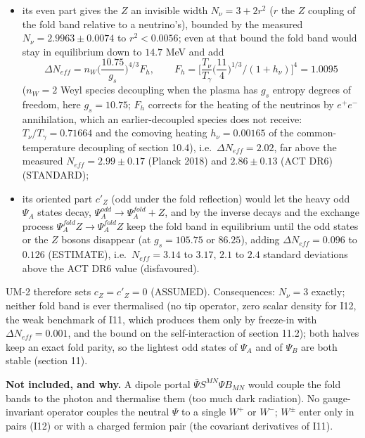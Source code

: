 \documentclass[
  10pt,
]{article}
\providecommand{\tightlist}{%
  \setlength{\itemsep}{0pt}\setlength{\parskip}{0pt}}
\begin{document}
\begin{itemize}
\tightlist
\item
  its even part gives the \(Z\) an invisible width \(N_\nu = 3 + 2r^2\)
  (\(r\) the \(Z\) coupling of the fold band relative to a neutrino's),
  bounded by the measured \(N_\nu = 2.9963 \pm 0.0074\) to
  \(r^2 < 0.0056\); even at that bound the fold band would stay in
  equilibrium down to \(14.7\) MeV and add
  \[ \Delta N_{eff} = n_W\Big(\frac{10.75}{g_s}\Big)^{4/3}F_h,\qquad F_h = \Big[\frac{T_\nu}{T_\gamma}\Big(\frac{11}{4}\Big)^{1/3}\Big/(1 + h_\nu)\Big]^4 = 1.0095 \]
  (\(n_W = 2\) Weyl species decoupling when the plasma has \(g_s\)
  entropy degrees of freedom, here \(g_s = 10.75\); \(F_h\) corrects for
  the heating of the neutrinos by \(e^+e^-\) annihilation, which an
  earlier-decoupled species does not receive:
  \(T_\nu/T_\gamma = 0.71664\) and the comoving heating
  \(h_\nu = 0.00165\) of the common-temperature decoupling of section
  10.4), i.e.~\(\Delta N_{eff} = 2.02\), far above the measured
  \(N_{eff} = 2.99 \pm 0.17\) (Planck 2018) and \(2.86 \pm 0.13\) (ACT
  DR6) (STANDARD);
\item
  its oriented part \(c'_Z\) (odd under the fold reflection) would let
  the heavy odd \(\Psi_A\) states decay,
  \(\Psi_A^{odd} \to \Psi_A^{fold} + Z\), and by the inverse decays and
  the exchange process \(\Psi_A^{fold}Z \to \Psi_A^{fold}Z\) keep the
  fold band in equilibrium until the odd states or the \(Z\) bosons
  disappear (at \(g_s = 105.75\) or \(86.25\)), adding
  \(\Delta N_{eff} = 0.096\) to \(0.126\) (ESTIMATE),
  i.e.~\(N_{eff} = 3.14\) to \(3.17\), \(2.1\) to \(2.4\) standard
  deviations above the ACT DR6 value (disfavoured).
\end{itemize}

UM-2 therefore sets \(c_Z = c'_Z = 0\) (ASSUMED). Consequences:
\(N_\nu = 3\) exactly; neither fold band is ever thermalised (no tip
operator, zero scalar density for I12, the weak benchmark of I11, which
produces them only by freeze-in with \(\Delta N_{eff} = 0.001\), and the
bound on the self-interaction of section 11.2); both halves keep an
exact fold parity, so the lightest odd states of \(\Psi_A\) and of
\(\Psi_B\) are both stable (section 11).

\textbf{Not included, and why.} A dipole portal
\(\bar\Psi S^{MN}\Psi B_{MN}\) would couple the fold bands to the photon
and thermalise them (too much dark radiation). No gauge-invariant
operator couples the neutral \(\Psi\) to a single \(W^+\) or \(W^-\);
\(W^\pm\) enter only in pairs (I12) or with a charged fermion pair (the
covariant derivatives of I11).
\end{document}
